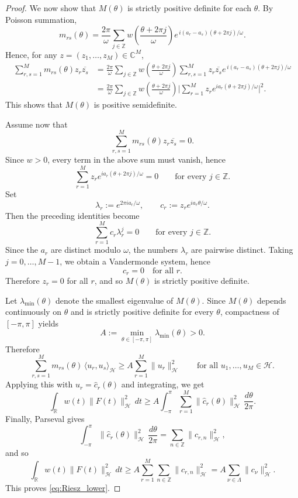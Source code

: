\documentclass[11pt]{amsart}
\newcommand{\1}{\mathbbm{1}}
\theoremstyle{plain}
\theoremstyle{definition}
\theoremstyle{remark}
\numberwithin{equation}{section}
\begin{document}
\begin{proof}
We now show that $M(\theta)$ is strictly positive definite for each $\theta$.
By Poisson summation,
\[
m_{rs}(\theta)
=
\frac{2\pi}{\omega}\sum_{j\in\mathbb Z}
w\!\left(\frac{\theta+2\pi j}{\omega}\right)
e^{\,i(a_r-a_s)(\theta+2\pi j)/\omega}.
\]
Hence, for any $z=(z_1,\dots,z_M)\in\mathbb C^M$,
\begin{align*}
\sum_{r,s=1}^M m_{rs}(\theta) z_r\overline{z_s}
&=
\frac{2\pi}{\omega}\sum_{j\in\mathbb Z}
w\!\left(\frac{\theta+2\pi j}{\omega}\right)
\sum_{r,s=1}^M
z_r\overline{z_s}
e^{\,i(a_r-a_s)(\theta+2\pi j)/\omega} \\
&=
\frac{2\pi}{\omega}\sum_{j\in\mathbb Z}
w\!\left(\frac{\theta+2\pi j}{\omega}\right)
\Big|\sum_{r=1}^M z_r e^{ia_r(\theta+2\pi j)/\omega}\Big|^2.
\end{align*}
This shows that $M(\theta)$ is positive semidefinite.

Assume now that
\[
\sum_{r,s=1}^M m_{rs}(\theta) z_r\overline{z_s}=0.
\]
Since $w>0$, every term in the above sum must vanish, hence
\[
\sum_{r=1}^M z_r e^{ia_r(\theta+2\pi j)/\omega}=0
\qquad\text{for every }j\in\mathbb Z.
\]
Set
\[
\lambda_r:=e^{2\pi i a_r/\omega},
\qquad
c_r:=z_r e^{ia_r\theta/\omega}.
\]
Then the preceding identities become
\[
\sum_{r=1}^M c_r \lambda_r^j = 0
\qquad\text{for every }j\in\mathbb Z.
\]
Since the $a_r$ are distinct modulo $\omega$, the numbers $\lambda_r$ are pairwise distinct. Taking $j=0,\dots,M-1$, we obtain a Vandermonde system, hence
\[
c_r=0 \quad\text{for all }r.
\]
Therefore $z_r=0$ for all $r$, and so $M(\theta)$ is strictly positive definite.

Let $\lambda_{\min}(\theta)$ denote the smallest eigenvalue of $M(\theta)$. Since $M(\theta)$ depends continuously on $\theta$ and is strictly positive definite for every $\theta$, compactness of $[-\pi,\pi]$ yields
\[
A:=\min_{\theta\in[-\pi,\pi]} \lambda_{\min}(\theta)>0.
\]
Therefore
\[
\sum_{r,s=1}^M
m_{rs}(\theta)\,
\langle u_r,u_s\rangle_{\mathcal H}
\ge
A\sum_{r=1}^M \|u_r\|_{\mathcal H}^2
\qquad
\text{for all }u_1,\dots,u_M\in\mathcal H.
\]
Applying this with $u_r=\widehat c_r(\theta)$ and integrating, we get
\[
\int_{\mathbb R} w(t)\|F(t)\|_{\mathcal H}^2\,dt
\ge
A\int_{-\pi}^{\pi}\sum_{r=1}^M \|\widehat c_r(\theta)\|_{\mathcal H}^2\,\frac{d\theta}{2\pi}.
\]
Finally, Parseval gives
\[
\int_{-\pi}^{\pi}\|\widehat c_r(\theta)\|_{\mathcal H}^2\,\frac{d\theta}{2\pi}
=
\sum_{n\in\mathbb Z}\|c_{r,n}\|_{\mathcal H}^2,
\]
and so
\[
\int_{\mathbb R} w(t)\|F(t)\|_{\mathcal H}^2\,dt
\ge
A\sum_{r=1}^M\sum_{n\in\mathbb Z}\|c_{r,n}\|_{\mathcal H}^2
=
A\sum_{\nu\in\Lambda}\|c_\nu\|_{\mathcal H}^2.
\]
This proves \eqref{eq:Riesz_lower}.
\end{proof}
\end{document}
